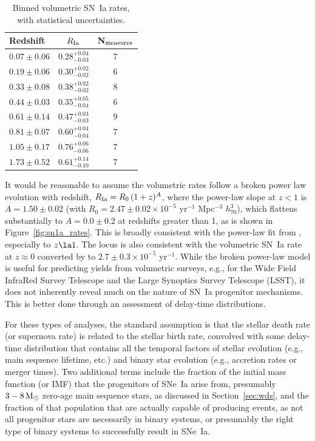 \documentclass[apj]{aastex62}
\begin{document}
\begin{table}[h]
   \centering
   \caption{Binned volumetric SN~Ia rates, with statistical uncertainties.}
   \begin{tabular}{lcc} 
   \hline
   \hline
   Redshift & $R_{\rm Ia}$\tablenotemark{a}&N$_{\rm measures}$\\
   \hline
$0.07 \pm{0.06}$ & $0.28^{+0.04}_{-0.03}$& 7\\
$0.19 \pm{0.06}$ & $0.30^{+0.02}_{-0.02}$& 6\\
$0.33 \pm{0.08}$ & $0.38^{+0.02}_{-0.02}$& 8\\
$0.44 \pm{0.03}$ & $0.35^{+0.05}_{-0.04}$& 6\\
$0.61 \pm{0.14}$ & $0.47^{+0.03}_{-0.03}$& 9\\
$0.81 \pm{0.07}$ & $0.60^{+0.04}_{-0.04}$& 7\\
$1.05 \pm{0.17}$ & $0.76^{+0.06}_{-0.06}$& 7\\
$1.73 \pm{0.52}$ & $0.61^{+0.14}_{-0.10}$& 7\\
\hline
   \end{tabular}
   \label{tab:sn1a_bin}
\end{table}

It would be reasonable to assume the volumetric rates follow a broken power law evolution with redshift, $R_{\rm Ia}=R_0\,(1+z)^A$, where  the power-law slope at $z<1$ is $A=1.50\pm0.02$ (with $R_0 = 2.47\pm0.02\times10^{-5}$ yr$^{-1}$ Mpc$^{-3}$ $h_{70}^3$), which flattens substantially to $A=0.0\pm0.2$ at redshifts greater than 1, as is shown in  Figure~\ref{fig:sn1a_rates}. This is broadly consistent with the power-law fit from \cite{Okumura:2014}, especially to $z\la1$. The locus is also consistent with the volumetric SN~Ia rate at $z\approx0$ converted by \cite{Li:2011b} to $2.7\pm0.3\times10^{-5}$ yr$^{-1}$. While the broken power-law model is useful for predicting yields from volumetric surveys, e.g., for the Wide Field InfraRed Survey Telescope \cite[\textit{WFIRST, }][]{Hounsell:2018fv} and the Large Synoptics Survey Telescope (LSST), it does not inherently reveal much on the nature of SN~Ia progenitor mechanisms. This is better done through an assessment of delay-time distributions.

For these types of analyses, the standard assumption is that the stellar death rate (or supernova rate) is related to the stellar birth rate, convolved with some delay-time distribution that contains all the temporal factors of stellar evolution (e.g., main sequence lifetime, etc.) and binary star evolution (e.g., accretion rates or merger times). Two additional terms include the fraction of the initial mass function (or IMF) that the progenitors of SNe~Ia arise from, presumably $3 - 8\, \rm{M}_{\odot}$ zero-age main sequence stars, as discussed in Section~\ref{sec:wds}, and the fraction of that population that are actually capable of producing events, as not all progenitor stars are necessarily in binary systems, or presumably the right type of binary systems to successfully result in SNe~Ia.
\end{document}
